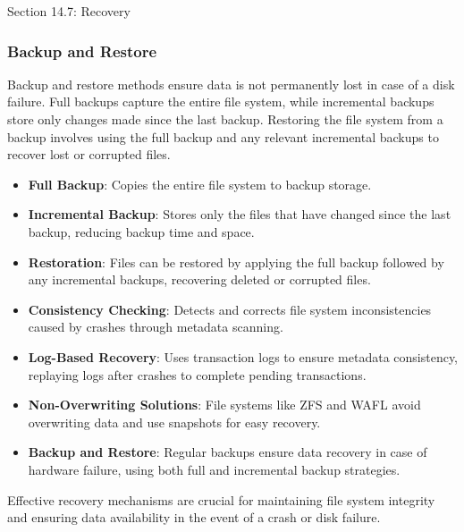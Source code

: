\begin{notes}{Section 14.7: Recovery}
\begin{highlight}
    \end{highlight}
    
    \subsubsection*{Backup and Restore}
    
    Backup and restore methods ensure data is not permanently lost in case of a disk failure. Full backups capture the entire file system, while incremental backups store only changes made since the 
    last backup. Restoring the file system from a backup involves using the full backup and any relevant incremental backups to recover lost or corrupted files.
    
    \begin{highlight}
    
        \begin{itemize}
            \item \textbf{Full Backup}: Copies the entire file system to backup storage.
            \item \textbf{Incremental Backup}: Stores only the files that have changed since the last backup, reducing backup time and space.
            \item \textbf{Restoration}: Files can be restored by applying the full backup followed by any incremental backups, recovering deleted or corrupted files.
        \end{itemize}
    
    \end{highlight}
    
    \begin{highlight}
    
        \begin{itemize}
            \item \textbf{Consistency Checking}: Detects and corrects file system inconsistencies caused by crashes through metadata scanning.
            \item \textbf{Log-Based Recovery}: Uses transaction logs to ensure metadata consistency, replaying logs after crashes to complete pending transactions.
            \item \textbf{Non-Overwriting Solutions}: File systems like ZFS and WAFL avoid overwriting data and use snapshots for easy recovery.
            \item \textbf{Backup and Restore}: Regular backups ensure data recovery in case of hardware failure, using both full and incremental backup strategies.
        \end{itemize}
    
    Effective recovery mechanisms are crucial for maintaining file system integrity and ensuring data availability in the event of a crash or disk failure.
    
    \end{highlight}
\end{notes}

